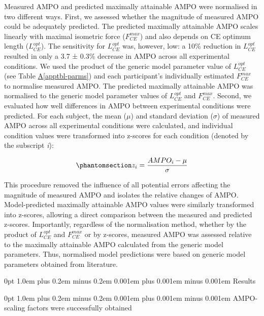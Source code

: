 \documentclass[
  11pt,
  a4paper]{article}
\makeatletter
\renewcommand{\section}{%
  \@startsection{section}{1}
    {0pt} 					%
    {1.0em plus 0.2em minus 0.2em} 	%
    {0.001em plus 0.001em minus 0.001em}    	%
    {\Large\bfseries\sffamily}%
}
\renewcommand{\subsection}{%
  \@startsection{subsection}{2}
    {0pt} 					%
    {1.0em plus 0.2em minus 0.2em} 	%
    {0.001em plus 0.001em minus 0.001em}    	%
    {\large\bfseries\sffamily}%
}
\newcommand*\quartoapptblref[1]{Table \hyperref[#1]{A\ref{#1}}}
\makeatother
\begin{document}
Measured AMPO and predicted maximally attainable AMPO were normalised in
two different ways. First, we assessed whether the magnitude of measured
AMPO could be adequately predicted. The predicted maximally attainable
AMPO scales linearly with maximal isometric force (\(F_{CE}^{max}\)) and
also depends on CE optimum length (\(L_{CE}^{opt}\)). The sensitivity
for \(L_{CE}^{opt}\) was, however, low: a 10\% reduction in
\(L_{CE}^{opt}\) resulted in only a 3.7 ± 0.3\% decrease in AMPO across
all experimental conditions. We used the product of the generic model
parameter value of \(L_{CE}^{opt}\) (see \quartoapptblref{apptbl-parms})
and each participant's individually estimated \(F_{CE}^{max}\) to
normalise measured AMPO. The predicted maximally attainable AMPO was
normalised to the generic model parameter values of \(L_{CE}^{opt}\) and
\(F_{CE}^{max}\). Second, we evaluated how well differences in AMPO
between experimental conditions were predicted. For each subject, the
mean (\(\mu\)) and standard deviation (\(\sigma\)) of measured AMPO
across all experimental conditions were calculated, and individual
condition values were transformed into z-scores for each condition
(denoted by the subscript \emph{i}):

\begin{equation}\protect\phantomsection\label{eq-rmtc}{
z_i = \frac{AMPO_i - \mu}{\sigma}
}\end{equation}

This procedure removed the influence of all potential errors affecting
the magnitude of measured AMPO and isolates the relative changes of
AMPO. Model-predicted maximally attainable AMPO values were similarly
transformed into z-scores, allowing a direct comparison between the
measured and predicted z-scores. Importantly, regardless of the
normalisation method, whether by the product of \(L_{CE}^{opt}\) and
\(F_{CE}^{max}\) or by z-scores, measured AMPO was assessed relative to
the maximally attainable AMPO calculated from the generic model
parameters. Thus, normalised model predictions were based on generic
model parameters obtained from literature.

\section{Results}\label{results}

\subsection{AMPO-scaling factors were successfully
obtained}\label{ampo-scaling-factors-were-successfully-obtained}
\end{document}
